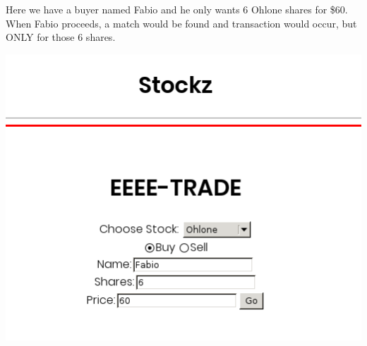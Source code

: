 Here we have a buyer named Fabio and he only wants 6 Ohlone shares for \$60. When Fabio proceeds, a match would be found and transaction would occur, but O\+N\+L\+Y for those 6 shares.

 
\includegraphics[scale=0.5]{../test9.png}
 